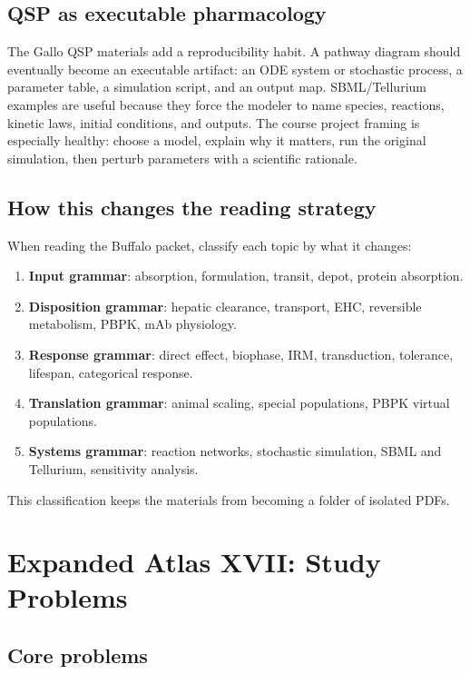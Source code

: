 \subsection{QSP as executable pharmacology}

The Gallo QSP materials add a reproducibility habit. A pathway diagram should eventually become an executable artifact: an ODE system or stochastic process, a parameter table, a simulation script, and an output map. SBML/Tellurium examples are useful because they force the modeler to name species, reactions, kinetic laws, initial conditions, and outputs. The course project framing is especially healthy: choose a model, explain why it matters, run the original simulation, then perturb parameters with a scientific rationale.

\subsection{How this changes the reading strategy}

When reading the Buffalo packet, classify each topic by what it changes:
\begin{enumerate}[leftmargin=2em]
  \item \textbf{Input grammar}: absorption, formulation, transit, depot, protein absorption.
  \item \textbf{Disposition grammar}: hepatic clearance, transport, EHC, reversible metabolism, PBPK, mAb physiology.
  \item \textbf{Response grammar}: direct effect, biophase, IRM, transduction, tolerance, lifespan, categorical response.
  \item \textbf{Translation grammar}: animal scaling, special populations, PBPK virtual populations.
  \item \textbf{Systems grammar}: reaction networks, stochastic simulation, SBML and Tellurium, sensitivity analysis.
\end{enumerate}
This classification keeps the materials from becoming a folder of isolated PDFs.

\section{Expanded Atlas XVII: Study Problems}

\subsection{Core problems}

